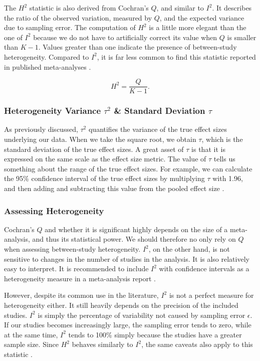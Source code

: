 \documentclass[../../../main.tex]{subfiles}
\begin{document}
The $H^2$ statistic is also derived from Cochran's $Q$, and similar to $I^2$. It describes the ratio of the observed variation, measured by $Q$, and the expected variance due to sampling error. The computation of $H^2$ is a little more elegant than the one of $I^2$ because we do not have to artificially correct its value when $Q$ is smaller than $K-1$. Values greater than one indicate the presence of between-study heterogeneity. Compared to $I^2$, it is far less common to find this statistic reported in published meta-analyses \autocite{Harrer2021}.

\begin{equation}
H^2 = \frac{Q}{K-1}.
\end{equation}

\subsubsection{Heterogeneity Variance $\tau^2$ \& Standard Deviation $\tau$}

As previously discussed, $\tau^2$ quantifies the variance of the true effect sizes underlying our data. When we take the square root, we obtain $\tau$, which is the standard deviation of the true effect sizes. A great asset of $\tau$ is that it is expressed on the same scale as the effect size metric. The value of $\tau$ tells us something about the range of the true effect sizes. For example, we can calculate the 95\% confidence interval of the true effect sizes by multiplying $\tau$ with 1.96, and then adding and subtracting this value from the pooled effect size \autocite{Harrer2021}.

\subsubsection{Assessing Heterogeneity}

Cochran's $Q$ and whether it is significant highly depends on the size of a meta-analysis, and thus its statistical power. We should therefore no only rely on $Q$ when assessing between-study heterogeneity. $I^2$, on the other hand, is not sensitive to changes in the number of studies in the analysis. It is also relatively easy to interpret. It is recommended to include $I^2$ with confidence intervals as a heterogeneity measure in a meta-analysis report \autocite{Harrer2021}.

However, despite its common use in the literature, $I^2$ is not a perfect measure for heterogeneity either. It still heavily depends on the precision of the included studies. $I^2$ is simply the percentage of variability not caused by sampling error $\epsilon$. If our studies becomes increasingly large, the sampling error tends to zero, while at the same time, $I^2$ tends to 100\% simply because the studies have a greater sample size. Since $H^2$ behaves similarly to $I^2$, the same caveats also apply to this statistic \autocite{Harrer2021}.
\end{document}
